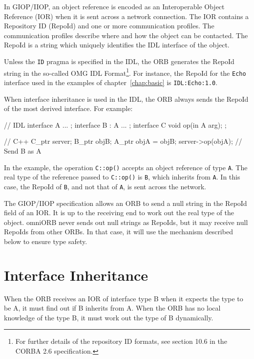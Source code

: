 \documentclass[11pt,twoside,a4paper]{book}
\newcommand{\type}[1]{\texttt{#1}}
\newcommand{\intf}[1]{\texttt{#1}}
\newcommand{\code}[1]{\texttt{#1}}
\newcommand{\op}[1]{\texttt{#1()}}
\begin{document}
In GIOP/IIOP, an object reference is encoded as an Interoperable
Object Reference (IOR) when it is sent across a network connection.
The IOR contains a Repository ID (RepoId) and one or more
communication profiles. The communication profiles describe where and
how the object can be contacted. The RepoId is a string which uniquely
identifies the IDL interface of the object.

Unless the \code{ID} pragma is specified in the IDL, the ORB generates
the RepoId string in the so-called OMG IDL Format\footnote{For further
details of the repository ID formats, see section 10.6 in the CORBA
2.6 specification.}. For instance, the RepoId for the \intf{Echo}
interface used in the examples of chapter~\ref{chap:basic} is
\texttt{IDL:Echo:1.0}.

When interface inheritance is used in the IDL, the ORB always sends the
RepoId of the most derived interface. For example:

\begin{idllisting}
   // IDL
   interface A {
     ...
   };
   interface B : A {
     ...
   };
   interface C {
      void op(in A arg);
   };
\end{idllisting}

\begin{cxxlisting}
   // C++
   C_ptr server;
   B_ptr objB;
   A_ptr objA = objB;
   server->op(objA);  // Send B as A
\end{cxxlisting}

In the example, the operation \op{C::op} accepts an object reference
of type \type{A}. The real type of the reference passed to \op{C::op}
is \type{B}, which inherits from \type{A}. In this case, the RepoId of
\type{B}, and not that of \type{A}, is sent across the network.

The GIOP/IIOP specification allows an ORB to send a null string in the
RepoId field of an IOR. It is up to the receiving end to work out the
real type of the object. omniORB never sends out null strings as
RepoIds, but it may receive null RepoIds from other ORBs. In that
case, it will use the mechanism described below to ensure type safety.


\section{Interface Inheritance}

When the ORB receives an IOR of interface type B when it expects the
type to be A, it must find out if B inherits from A. When the ORB has
no local knowledge of the type B, it must work out the type of B
dynamically.
\end{document}
